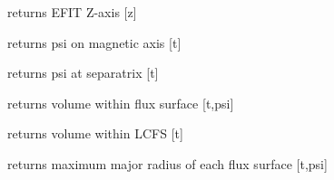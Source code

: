 \documentclass[letterpaper,10pt,english]{sphinxmanual}
\begin{document}
\begin{fulllineitems}
\begin{fulllineitems}
\label{eqtools:eqtools.EFIT.EFITTree.getZGrid}
returns EFIT Z-axis {[}z{]}

\end{fulllineitems}


\begin{fulllineitems}
\label{eqtools:eqtools.EFIT.EFITTree.getFluxAxis}
returns psi on magnetic axis {[}t{]}

\end{fulllineitems}


\begin{fulllineitems}
\label{eqtools:eqtools.EFIT.EFITTree.getFluxLCFS}
returns psi at separatrix {[}t{]}

\end{fulllineitems}


\begin{fulllineitems}
\label{eqtools:eqtools.EFIT.EFITTree.getFluxVol}
returns volume within flux surface {[}t,psi{]}

\end{fulllineitems}


\begin{fulllineitems}
\label{eqtools:eqtools.EFIT.EFITTree.getVolLCFS}
returns volume within LCFS {[}t{]}

\end{fulllineitems}


\begin{fulllineitems}
\label{eqtools:eqtools.EFIT.EFITTree.getRmidPsi}
returns maximum major radius of each flux surface {[}t,psi{]}

\end{fulllineitems}


\end{fulllineitems}
\end{document}
